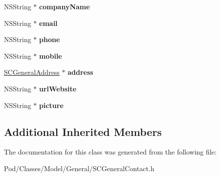 \begin{DoxyCompactItemize}
\item 
N\+S\+String $\ast$ {\bfseries company\+Name}\hypertarget{interface_s_c_general_contact_ae5be6eb79e66c51e56eafe742b0604e4}{}\label{interface_s_c_general_contact_ae5be6eb79e66c51e56eafe742b0604e4}

\item 
N\+S\+String $\ast$ {\bfseries email}\hypertarget{interface_s_c_general_contact_a6bf79a8593fa8ef2dd7b038482f9c570}{}\label{interface_s_c_general_contact_a6bf79a8593fa8ef2dd7b038482f9c570}

\item 
N\+S\+String $\ast$ {\bfseries phone}\hypertarget{interface_s_c_general_contact_a1106f2cda8c52f6930acba9b2443558c}{}\label{interface_s_c_general_contact_a1106f2cda8c52f6930acba9b2443558c}

\item 
N\+S\+String $\ast$ {\bfseries mobile}\hypertarget{interface_s_c_general_contact_a8670915a62dbb4892922154a4c552831}{}\label{interface_s_c_general_contact_a8670915a62dbb4892922154a4c552831}

\item 
\hyperlink{interface_s_c_general_address}{S\+C\+General\+Address} $\ast$ {\bfseries address}\hypertarget{interface_s_c_general_contact_adfd777b6e8577916c70fa4c02e40890a}{}\label{interface_s_c_general_contact_adfd777b6e8577916c70fa4c02e40890a}

\item 
N\+S\+String $\ast$ {\bfseries url\+Website}\hypertarget{interface_s_c_general_contact_a39522a5a061da79719d1dbe1f9ea7a39}{}\label{interface_s_c_general_contact_a39522a5a061da79719d1dbe1f9ea7a39}

\item 
N\+S\+String $\ast$ {\bfseries picture}\hypertarget{interface_s_c_general_contact_ac17278bd4167cc5d1e26ef63ac30058b}{}\label{interface_s_c_general_contact_ac17278bd4167cc5d1e26ef63ac30058b}

\end{DoxyCompactItemize}
\subsection*{Additional Inherited Members}


The documentation for this class was generated from the following file\+:\begin{DoxyCompactItemize}
\item 
Pod/\+Classes/\+Model/\+General/S\+C\+General\+Contact.\+h\end{DoxyCompactItemize}
